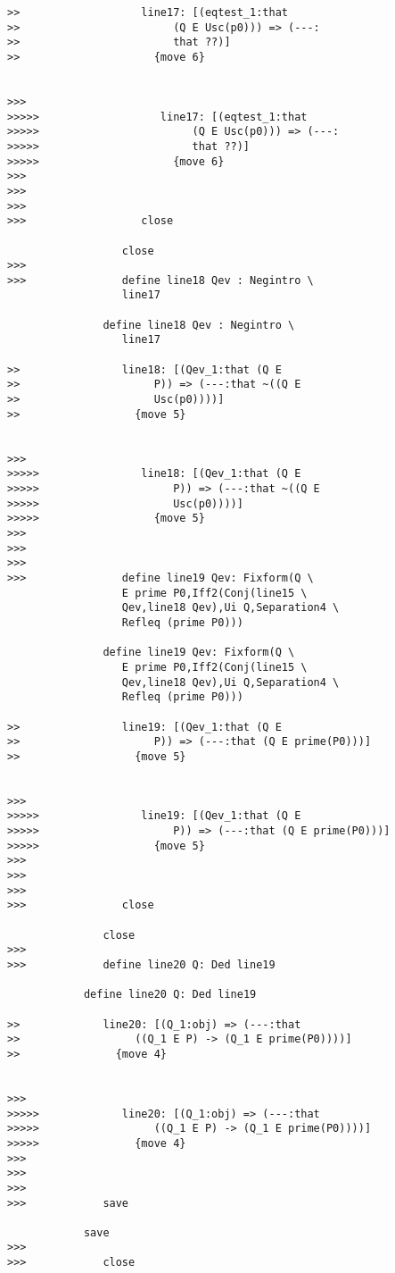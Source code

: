 \documentclass[12pt]{article}
\begin{document}
\begin{verbatim}
>>                   line17: [(eqtest_1:that
>>                        (Q E Usc(p0))) => (---:
>>                        that ??)]
>>                     {move 6}


>>>
>>>>>                   line17: [(eqtest_1:that
>>>>>                        (Q E Usc(p0))) => (---:
>>>>>                        that ??)]
>>>>>                     {move 6}
>>>
>>>
>>>
>>>                  close

                  close
>>>
>>>               define line18 Qev : Negintro \
                  line17

               define line18 Qev : Negintro \
                  line17

>>                line18: [(Qev_1:that (Q E
>>                     P)) => (---:that ~((Q E
>>                     Usc(p0))))]
>>                  {move 5}


>>>
>>>>>                line18: [(Qev_1:that (Q E
>>>>>                     P)) => (---:that ~((Q E
>>>>>                     Usc(p0))))]
>>>>>                  {move 5}
>>>
>>>
>>>
>>>               define line19 Qev: Fixform(Q \
                  E prime P0,Iff2(Conj(line15 \
                  Qev,line18 Qev),Ui Q,Separation4 \
                  Refleq (prime P0)))

               define line19 Qev: Fixform(Q \
                  E prime P0,Iff2(Conj(line15 \
                  Qev,line18 Qev),Ui Q,Separation4 \
                  Refleq (prime P0)))

>>                line19: [(Qev_1:that (Q E
>>                     P)) => (---:that (Q E prime(P0)))]
>>                  {move 5}


>>>
>>>>>                line19: [(Qev_1:that (Q E
>>>>>                     P)) => (---:that (Q E prime(P0)))]
>>>>>                  {move 5}
>>>
>>>
>>>
>>>               close

               close
>>>
>>>            define line20 Q: Ded line19

            define line20 Q: Ded line19

>>             line20: [(Q_1:obj) => (---:that
>>                  ((Q_1 E P) -> (Q_1 E prime(P0))))]
>>               {move 4}


>>>
>>>>>             line20: [(Q_1:obj) => (---:that
>>>>>                  ((Q_1 E P) -> (Q_1 E prime(P0))))]
>>>>>               {move 4}
>>>
>>>
>>>
>>>            save

            save
>>>
>>>            close


\end{verbatim}
\end{document}
